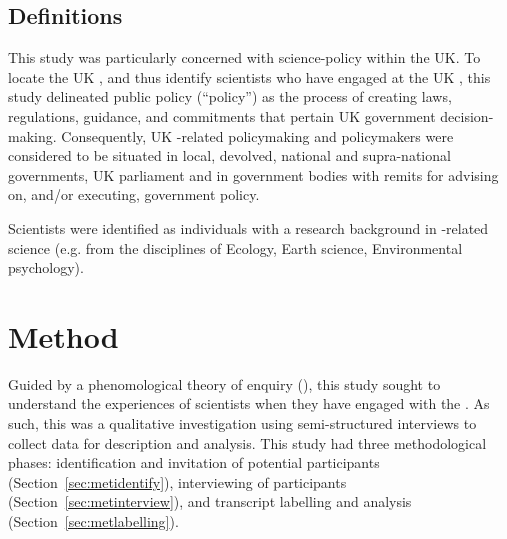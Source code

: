 
\subsection{Definitions}\label{sec:metdefinitions}

This study was particularly concerned with \CAN{} science-policy within the UK. To locate the UK \SPI, and thus identify scientists who have engaged at the UK \SPI, this study delineated public policy (``policy'') as the process of creating laws, regulations, guidance, and commitments that pertain UK government decision-making. Consequently, UK \CAN-related policymaking and policymakers were considered to be situated in local, devolved, national and supra-national governments, UK parliament and in government bodies with remits for advising on, and/or executing, \CAN{} government policy.

Scientists were identified as individuals with a research background in \CAN-related science (e.g. from the disciplines of Ecology, Earth science, Environmental psychology).


\section{Method}\label{sec:method}

Guided by a phenomological theory of enquiry (\cite{CreswellP2017}), this study sought to understand the experiences of \CAN{} scientists when they have engaged with the \SPI. As such, this was a qualitative investigation using semi-structured interviews to collect data for description and analysis. This study had three methodological phases: identification and invitation of potential participants (Section~\ref{sec:metidentify}), interviewing of participants (Section~\ref{sec:metinterview}), and transcript labelling and analysis (Section~\ref{sec:metlabelling}). %


